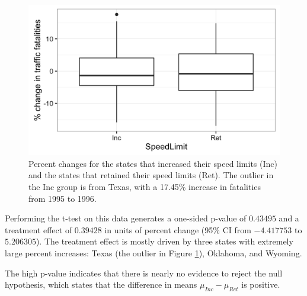 \documentclass[11pt]{exam} %
\begin{document}
\begin{questions}
\begin{figure}[h!]
	\centering
	\includegraphics[width=5in]{8.png}
	\caption{Percent changes for the states that increased their speed limits (Inc) and the states that retained their speed limits (Ret). The outlier in the Inc group is from Texas, with a 17.45\% increase in fatalities from 1995 to 1996.}
	\label{fig:8}
\end{figure}


Performing the t-test on this data generates a one-sided p-value of $0.43495$ and a treatment effect of $0.39428$ in units of percent change (95\% CI from $-4.417753$ to $5.206305$). The treatment effect is mostly driven by three states with extremely large percent increases: Texas (the outlier in Figure \ref{fig:8}), Oklahoma, and Wyoming.

The high p-value indicates that there is nearly no evidence to reject the null hypothesis, which states that the difference in means $\mu_{Inc} - \mu_{Ret}$ is positive.





\end{questions}

\listoftodos
\end{document}
